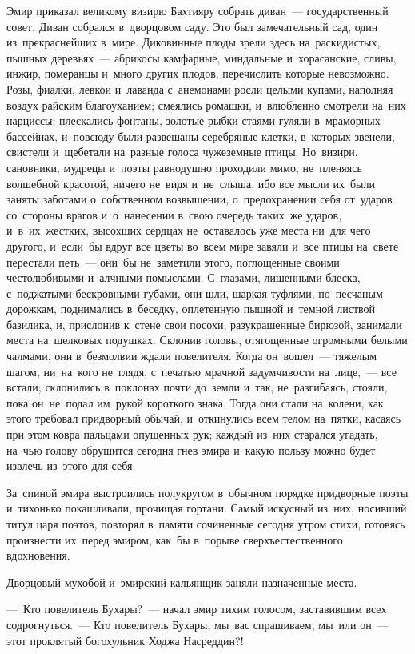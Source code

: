 \documentclass[12pt,a4paper]{book}
\begin{document}
Эмир приказал великому визирю Бахтияру собрать диван~— государственный совет. Диван собрался в~дворцовом саду. Это был замечательный сад, один из~прекраснейших в~мире. Диковинные плоды зрели здесь на~раскидистых, пышных деревьях~— абрикосы камфарные, миндальные и~хорасанские, сливы, инжир, померанцы и~много других плодов, перечислить которые невозможно. Розы, фиалки, левкои и~лаванда с~анемонами росли целыми купами, наполняя воздух райским благоуханием; смеялись ромашки, и~влюбленно смотрели на~них нарциссы; плескались фонтаны, золотые рыбки стаями гуляли в~мраморных бассейнах, и~повсюду были развешаны серебряные клетки, в~которых звенели, свистели и~щебетали на~разные голоса чужеземные птицы. Но~визири, сановники, мудрецы и~поэты равнодушно проходили мимо, не~пленяясь волшебной красотой, ничего не~видя и~не~слыша, ибо все мысли их~были заняты заботами о~собственном возвышении, о~предохранении себя от~ударов со~стороны врагов и~о~нанесении в~свою очередь таких~же ударов, и~в~их~жестких, высохших сердцах не~оставалось уже места ни~для чего другого, и~если~бы вдруг все цветы во~всем мире завяли и~все птицы на~свете перестали петь~— они~бы не~заметили этого, поглощенные своими честолюбивыми и~алчными помыслами. С~глазами, лишенными блеска, с~поджатыми бескровными губами, они шли, шаркая туфлями, по~песчаным дорожкам, поднимались в~беседку, оплетенную пышной и~темной листвой базилика, и, прислонив к~стене свои посохи, разукрашенные бирюзой, занимали места на~шелковых подушках. Склонив головы, отягощенные огромными белыми чалмами, они в~безмолвии ждали повелителя. Когда он~вошел~— тяжелым шагом, ни~на~кого не~глядя, с~печатью мрачной задумчивости на~лице,~— все встали; склонились в~поклонах почти до~земли и~так, не~разгибаясь, стояли, пока он~не~подал им~рукой короткого знака. Тогда они стали на~колени, как этого требовал придворный обычай, и~откинулись всем телом на~пятки, касаясь при этом ковра пальцами опущенных рук; каждый из~них старался угадать, на~чью голову обрушится сегодня гнев эмира и~какую пользу можно будет извлечь из~этого для себя.

За~спиной эмира выстроились полукругом в~обычном порядке придворные поэты и~тихонько покашливали, прочищая гортани. Самый искусный из~них, носивший титул царя поэтов, повторял в~памяти сочиненные сегодня утром стихи, готовясь произнести их~перед эмиром, как~бы в~порыве сверхъестественного вдохновения.

Дворцовый мухобой и~эмирский кальянщик заняли назначенные места.

—~Кто повелитель Бухары?~— начал эмир тихим голосом, заставившим всех содрогнуться.~— Кто повелитель Бухары, мы~вас спрашиваем, мы~или он~— этот проклятый богохульник Ходжа Насреддин?!
\end{document}
